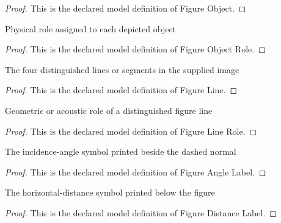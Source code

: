 \begin{proof}
  This is the declared model definition of Figure Object.
\end{proof}
\begin{definition}
  \label{def:physics:phyx-mini-0209:phyxminiproblems-problemphyxmini0209-figureobjectrole}
  Physical role assigned to each depicted object
\end{definition}
\begin{proof}
  This is the declared model definition of Figure Object Role.
\end{proof}
\begin{definition}
  \label{def:physics:phyx-mini-0209:phyxminiproblems-problemphyxmini0209-figureline}
  The four distinguished lines or segments in the supplied image
\end{definition}
\begin{proof}
  This is the declared model definition of Figure Line.
\end{proof}
\begin{definition}
  \label{def:physics:phyx-mini-0209:phyxminiproblems-problemphyxmini0209-figurelinerole}
  Geometric or acoustic role of a distinguished figure line
\end{definition}
\begin{proof}
  This is the declared model definition of Figure Line Role.
\end{proof}
\begin{definition}
  \label{def:physics:phyx-mini-0209:phyxminiproblems-problemphyxmini0209-figureanglelabel}
  The incidence-angle symbol printed beside the dashed normal
\end{definition}
\begin{proof}
  This is the declared model definition of Figure Angle Label.
\end{proof}
\begin{definition}
  \label{def:physics:phyx-mini-0209:phyxminiproblems-problemphyxmini0209-figuredistancelabel}
  The horizontal-distance symbol printed below the figure
\end{definition}
\begin{proof}
  This is the declared model definition of Figure Distance Label.
\end{proof}
